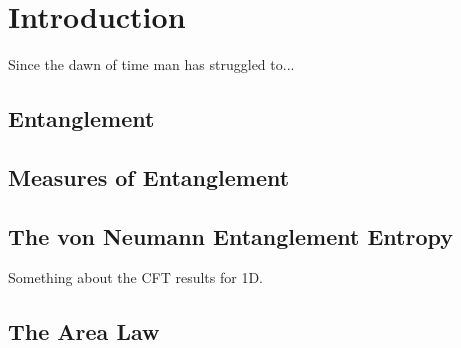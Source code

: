 \chapter{Introduction}

Since the dawn of time man has struggled to...




\section{Entanglement}

\section{Measures of Entanglement}

\section{The von Neumann Entanglement Entropy}
Something about the CFT results for 1D.

\section{The Area Law}

